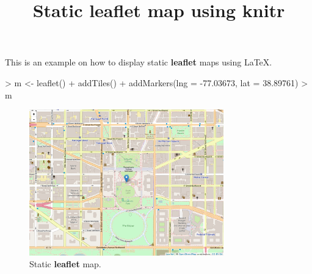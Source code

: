 \documentclass[12pt]{article}
\title{Static \textbf{leaflet} map using \textbf{knitr}}
\author{\vspace{-10ex}}
\date{\vspace{-5ex}}
\begin{document}



\maketitle

This is an example on how to display static \textbf{leaflet} maps using \LaTeX.

\begin{Schunk}
\begin{Sinput}
> m <- leaflet() %
+   addTiles() %
+   addMarkers(lng = -77.03673, lat = 38.89761)
> m
\end{Sinput}
\end{Schunk}


\begin{figure}[!htbd]
  \begin{center}
    \includegraphics[width = 0.75\textwidth]{leaflet_map.png}
    \caption{Static \textbf{leaflet} map.}
  \end{center}
  \end{figure}
  
\end{document}

